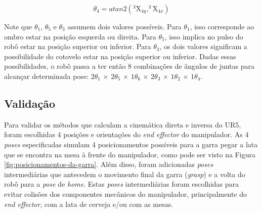 \begin{equation}\label{eq:theta-4}
\theta _4 = atan2 \left ( ^{3}\textrm{X}_{4y},^{3}\textrm{X}_{4x} \right )
\end{equation}

Note que $\theta_{1}$, $\theta_{5}$ e $\theta_{3}$ assumem dois valores possíveis. Para $\theta_{1}$, isso corresponde ao ombro estar na posição esquerda ou direita. Para $\theta_{5}$, isso implica no pulso do robô estar na posição superior ou inferior. Para $\theta_{3}$, os dois valores significam a possibilidade do cotovelo estar na posição superior ou inferior.
Dadas essas possibilidades, o robô passa a ter então 8 combinações de ângulos de juntas para alcançar determinada pose: $2\theta_{1}$ × $2\theta_{5}$ × $1\theta_{6}$ × $2\theta_{3}$ × $1\theta_{2}$ × $1\theta_{4}$.

\subsection{Validação}
Para validar os métodos que calculam a cinemática direta e inversa do UR5, foram escolhidas
4 posições e orientações do \textit{end effector} do manipulador. As 4 \textit{poses} especificadas
simulam 4 posicionamentos possíveis para a garra pegar a lata que se encontra na mesa à frente
do manipulador, como pode ser visto na Figura \ref{fig:posicionamentos-da-garra}. Além disso,
foram adicionadas \textit{poses} intermediárias que antecedem o movimento final da garra
(\textit{grasp}) e a volta do robô para a \textit{pose} de \textit{home}. Estas \textit{poses}
intermediárias foram escolhidas para evitar colisões dos componentes mecânicos do manipulador,
principalmente do \textit{end effector}, com a lata de cerveja e/ou com as mesas.


